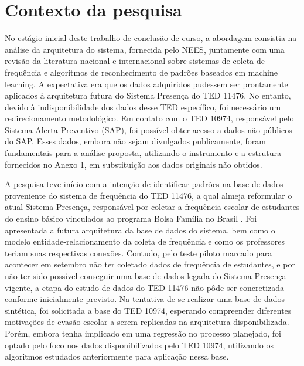 \chapter{Contexto da pesquisa}




No estágio inicial deste trabalho de conclusão de curso, a abordagem consistia na análise da arquitetura do sistema, fornecida pelo NEES, juntamente com uma revisão da literatura nacional e internacional sobre sistemas de coleta de frequência e algoritmos de reconhecimento de padrões baseados em machine learning. A expectativa era que os dados adquiridos pudessem ser prontamente aplicados à arquitetura futura do Sistema Presença do TED 11476. No entanto, devido à indisponibilidade dos dados desse TED específico, foi necessário um redirecionamento metodológico. Em contato com o TED 10974, responsável pelo Sistema Alerta Preventivo (SAP), foi possível obter acesso a dados não públicos do SAP. Esses dados, embora não sejam divulgados publicamente, foram fundamentais para a análise proposta, utilizando o instrumento e a estrutura fornecidos no Anexo 1, em substituição aos dados originais não obtidos.

A pesquisa teve início com a intenção de identificar padrões na base de dados proveniente do sistema de frequência do TED 11476, a qual almeja reformular o atual Sistema Presença, responsável por coletar a frequência escolar de estudantes do ensino básico vinculados ao programa Bolsa Família no Brasil \cite{BolsaFamilia}. Foi apresentada a futura arquitetura da base de dados do sistema, bem como o modelo entidade-relacionamento da coleta de frequência e como os professores teriam suas respectivas conexões. Contudo, pelo teste piloto marcado para acontecer em setembro não ter coletado dados de frequência de estudantes, e por não ter sido possível conseguir uma base de dados legada do Sistema Presença vigente, a etapa do estudo de dados do TED 11476 não pôde ser concretizada conforme inicialmente previsto. Na tentativa de se realizar uma base de dados sintética, foi solicitada a base do TED 10974, esperando compreender diferentes motivações de evasão escolar a serem replicadas na arquitetura disponibilizada. Porém, embora tenha implicado em uma regressão no processo planejado, foi optado pelo foco nos dados disponibilizados pelo TED 10974, utilizando os algoritmos estudados anteriormente para aplicação nessa base.

